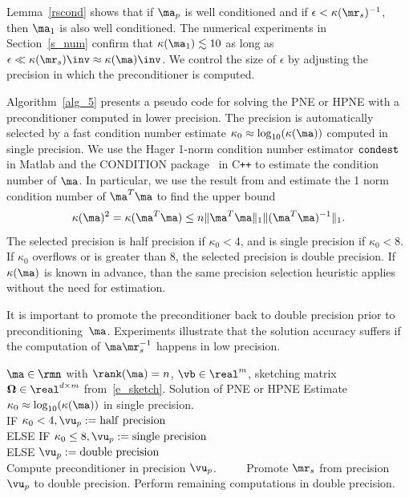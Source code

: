 \documentclass[final]{siamart220329}%
\begin{document}
 Lemma~\ref{rscond} shows that if $\ma_p$ is well conditioned and if $\epsilon<\kappa(\mr_s)^{-1}$, then
 $\ma_1$ is also well conditioned. 
 The numerical experiments in Section~\ref{s_num} confirm
 that $\kappa(\ma_1)\lesssim 10$ as long as $\epsilon\ll \kappa(\mr_s)\inv \approx \kappa(\ma)\inv$. 
We control the size of $\epsilon$
 by adjusting the precision in which the preconditioner is computed.

 Algorithm~\ref{alg_5} presents a pseudo code for solving the PNE or HPNE with a preconditioner computed in lower precision.
The precision is automatically selected 
 by a fast condition number estimate 
 $\kappa_0\approx \log_{10}(\kappa(\ma))$
 computed in single precision. We use the Hager 1-norm condition number estimator $\verb|condest|$ in Matlab and the CONDITION package~\cite{burkardt2012condition} in C\texttt{++} to estimate the condition number of $\ma$. In particular, 
 we use the result from \cite[Exercise 2, Section 2.6]{IIbook} and estimate the 1 norm condition number of $\ma^T\ma$ to find the upper bound
 $$\kappa(\ma)^2=\kappa(\ma^T\ma)\leq n\|\ma^T\ma\|_1\|(\ma^T\ma)^{-1}\|_1.$$ 
 The selected precision is half precision if $\kappa_0<4$, and is single precision if $\kappa_0<8$. 
If $\kappa_0$ overflows or is greater than 8, the selected precision is double precision. If $\kappa(\ma)$ is known in advance, than the same precision selection heuristic applies without the need for estimation. 
 
  It is important to promote
 the preconditioner back to double precision prior to preconditioning~$\ma$.
 Experiments illustrate that the solution accuracy suffers if 
 the computation of $\ma\mr_s^{-1}$ happens in low precision.

\begin{algorithm}
\caption{PNE/HPNE with randomized low precision preconditioner}\label{alg_5}
\begin{algorithmic}
\Require $\ma\in\rmn$ with $\rank(\ma)=n$, $\vb\in\real^m$, sketching matrix $\mathbf{\Omega}\in\real^{d\times m}$ from~\eqref{e_sketch}. 
\Ensure Solution of PNE or HPNE  
\medskip
\State Estimate $\kappa_0\approx \log_{10}(\kappa(\ma))$ in single precision.\\
\medskip\qquad 
IF $\kappa_0<4, \vu_p:=\mathrm{half~precision}$\\
\medskip\qquad
ELSE IF $\kappa_0\leq 8, \vu_p:=\mathrm{single~precision}$\\
\medskip\qquad
ELSE  $\vu_p:=\mathrm{double~precision}$\\
\State Compute preconditioner in precision $\vu_p$.
\smallskip
{} 
\smallskip
{}
\smallskip
\State $\qquad$ Promote $\mr_s$ from precision $\vu_p$ to double precision. 
\medskip
\State Perform remaining computations in double precision.
\smallskip
{} \qquad %
\smallskip
{}
\end{algorithmic}
\end{algorithm}
\end{document}
